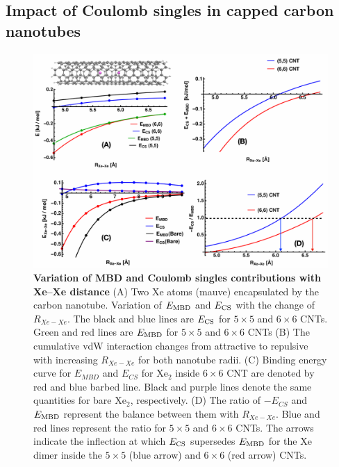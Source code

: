 \documentclass[aps,prl,groupaddress, twocolumn]{revtex4-1}  %
\begin{document}
\subsection*{Impact of Coulomb singles in capped carbon nanotubes}
\begin{figure}[hbtp]
\includegraphics[scale=0.5, width=\textwidth]{Plots/CNTplots.pdf}
\caption{\textbf{Variation of MBD and Coulomb singles contributions with Xe--Xe distance} (A) Two Xe atoms (mauve) encapsulated by the carbon nanotube.  Variation of $E_{\rm MBD}$ and $E_{\rm CS}$ with the change of $R_{Xe-Xe}$. The black and blue lines are $E_{\rm CS}$ for $5 \times 5$ and $6 \times 6$ CNTs. %
Green and red lines are $E_{\rm MBD}$ for $5 \times 5$ and $6 \times 6$ CNTs %
(B) The cumulative vdW interaction changes from attractive to repulsive with increasing $R_{Xe-Xe}$ for both nanotube radii.
(C) Binding energy curve for $E_{MBD}$ and $E_{CS}$ for Xe$_2$ inside $6 \times 6$ CNT are denoted by red and blue barbed line. Black and purple lines denote the same quantities for bare Xe$_2$, respectively. 
(D) The ratio of $-E_{CS}$ and $E_{\rm MBD}$ represent the balance between them with $R_{Xe-Xe}$. Blue and red lines represent the ratio for $5\times5$ and $6\times6$ CNTs. %
The arrows indicate the inflection at which $E_{\rm CS}$ supersedes $E_{\rm MBD}$ for the Xe dimer inside the $5 \times 5$ (blue arrow) and $6 \times 6$ (red arrow) CNTs.
}\label{fig:CNT}
\end{figure}
\end{document}
